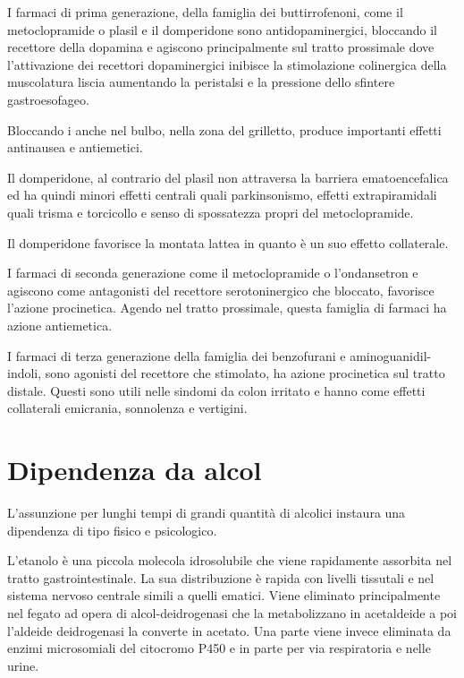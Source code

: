 I farmaci di prima generazione, della famiglia dei buttirrofenoni, come il metoclopramide o plasil e il domperidone sono antidopaminergici, bloccando il recettore  della dopamina e agiscono principalmente sul tratto prossimale dove l'attivazione dei recettori dopaminergici inibisce la stimolazione colinergica della muscolatura liscia aumentando la peristalsi e la pressione dello sfintere gastroesofageo.

Bloccando i  anche nel bulbo, nella zona del grilletto, produce importanti effetti antinausea e antiemetici.

Il domperidone, al contrario del plasil non attraversa la barriera ematoencefalica ed ha quindi minori effetti centrali quali parkinsonismo, effetti extrapiramidali quali trisma e torcicollo e senso di spossatezza propri del metoclopramide.

Il domperidone favorisce la montata lattea in quanto è un suo effetto collaterale.

I farmaci di seconda generazione come il metoclopramide o l'ondansetron e agiscono come antagonisti del recettore serotoninergico  che bloccato, favorisce l'azione procinetica. Agendo nel tratto prossimale, questa famiglia di farmaci ha azione antiemetica.

I farmaci di terza generazione della famiglia dei benzofurani e aminoguanidil-indoli, sono agonisti del recettore  che stimolato, ha azione procinetica sul tratto distale. Questi sono utili nelle sindomi da colon irritato e hanno come effetti collaterali emicrania, sonnolenza e vertigini.

\section{Dipendenza da alcol}

L'assunzione per lunghi tempi di grandi quantità di alcolici instaura una dipendenza di tipo fisico e psicologico.

L'etanolo è una piccola molecola idrosolubile che viene rapidamente assorbita nel tratto gastrointestinale. La sua distribuzione è rapida con livelli tissutali e nel sistema nervoso centrale simili a quelli ematici. Viene eliminato principalmente nel fegato ad opera di alcol-deidrogenasi che la metabolizzano in acetaldeide a poi l'aldeide deidrogenasi la converte in acetato. Una parte viene invece eliminata da enzimi microsomiali del citocromo P450 e in parte per via respiratoria e nelle urine.

